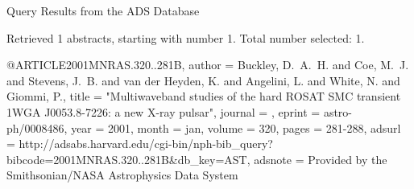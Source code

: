 Query Results from the ADS Database


Retrieved 1 abstracts, starting with number 1.  Total number selected: 1.

@ARTICLE{2001MNRAS.320..281B,
   author = {{Buckley}, D.~A.~H. and {Coe}, M.~J. and {Stevens}, J.~B. and 
	{van der Heyden}, K. and {Angelini}, L. and {White}, N. and 
	{Giommi}, P.},
    title = "{Multiwaveband studies of the hard ROSAT SMC transient 1WGA J0053.8-7226: a new X-ray pulsar}",
  journal = {\mnras},
   eprint = {astro-ph/0008486},
     year = 2001,
    month = jan,
   volume = 320,
    pages = {281-288},
   adsurl = {http://adsabs.harvard.edu/cgi-bin/nph-bib_query?bibcode=2001MNRAS.320..281B&db_key=AST},
  adsnote = {Provided by the Smithsonian/NASA Astrophysics Data System}
}



